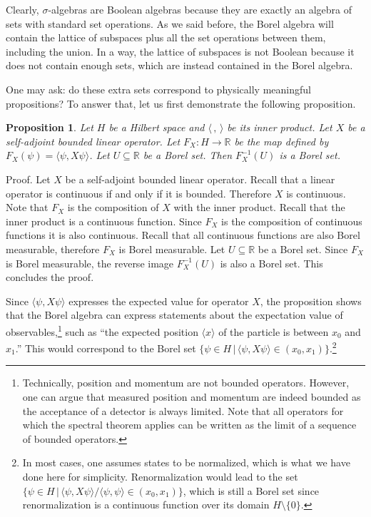 \documentclass[11pt, executivepaper]{article}
\newtheorem{prop}{Proposition}
\begin{document}
Clearly, $\sigma$-algebras are Boolean algebras because they are exactly an algebra of sets with standard set operations. As we said before, the Borel algebra will contain the lattice of subspaces plus all the set operations between them, including the union. In a way, the lattice of subspaces is not Boolean because it does not contain enough sets, which are instead contained in the Borel algebra.

One may ask: do these extra sets correspond to physically meaningful propositions? To answer that, let us first demonstrate the following proposition.

\begin{prop}
	Let $H$ be a Hilbert space and $\langle \, , \, \rangle$ be its inner product. Let $X$ be a self-adjoint bounded linear operator. Let $F_X : H \to \mathbb{R}$ be the map defined by $F_X(\psi) = \langle \psi , X \psi \rangle$. Let $U \subseteq \mathbb{R}$ be a Borel set. Then $F_X^{-1}(U)$ is a Borel set.
\end{prop}

Proof. Let $X$ be a self-adjoint bounded linear operator. Recall that a linear operator is continuous if and only if it is bounded. Therefore $X$ is continuous. Note that $F_X$ is the composition of $X$ with the inner product. Recall that the inner product is a continuous function. Since $F_X$ is the composition of continuous functions it is also continuous. Recall that all continuous functions are also Borel measurable, therefore $F_X$ is Borel measurable. Let $U \subseteq \mathbb{R}$ be a Borel set. Since $F_X$ is Borel measurable, the reverse image $F_X^{-1}(U)$ is also a Borel set. This concludes the proof.

Since $\langle \psi , X \psi \rangle$ expresses the expected value for operator $X$, the proposition shows that the Borel algebra can express statements about the expectation value of observables,\footnote{Technically, position and momentum are not bounded operators. However, one can argue that measured position and momentum are indeed bounded as the acceptance of a detector is always limited. Note that all operators for which the spectral theorem applies can be written as the limit of a sequence of bounded operators.} such as ``the expected position $\langle x \rangle$ of the particle is between $x_0$ and $x_1$.'' This would correspond to the Borel set $\{ \psi \in H \, | \, \langle \psi , X \psi \rangle \in (x_0, x_1) \}$.\footnote{In most cases, one assumes states to be normalized, which is what we have done here for simplicity. Renormalization would lead to the set $\{ \psi \in H \, | \, \langle \psi , X \psi \rangle / \langle \psi , \psi \rangle \in (x_0, x_1) \}$, which is still a Borel set since renormalization is a continuous function over its domain $H \setminus \{ 0 \}$.}
\end{document}
